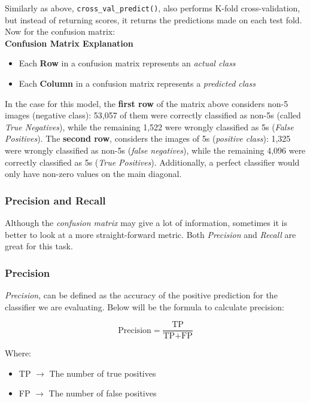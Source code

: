 \noindent
Similarly as above, \texttt{cross_val_predict()}, also performs K-fold cross-validation,
but instead of returning scores, it returns the predictions made on each test fold. Now for the
confusion matrix:\\

\noindent 
\textbf{Confusion Matrix Explanation}
\begin{itemize}
    \item Each \textbf{Row} in a confusion matrix represents an \textit{actual class}
    \item Each \textbf{Column} in a confusion matrix represents a \textit{predicted class}
\end{itemize}

\noindent
In the case for this model, the \textbf{first row} of the matrix above considers non-5 images (negative class):
53,057 of them were correctly classified as non-5s (called \textit{True Negatives}), while the 
remaining 1,522 were wrongly classified as 5s (\textit{False Positives}). The \textbf{second row}, 
considers the images of 5s (\textit{positive class}): 1,325 were wrongly classified as non-5s 
(\textit{false negatives}), while the remaining 4,096 were correctly classified as 5s (\textit{True Positives}).
Additionally, a perfect classifier would only have non-zero values on the main diagonal. 

\subsubsection{Precision and Recall}

Although the \textit{confusion matrix} may give a lot of information, sometimes it is better to look at a more 
straight-forward metric. Both \textit{Precision} and \textit{Recall} are great for this task.

\subsubsection*{Precision}

\textit{Precision}, can be defined as the accuracy of the positive prediction for the classifier we are evaluating.
Below will be the formula to calculate precision:

$$\text{Precision} = \frac{\text{TP}}{\text{TP} + \text{FP}}$$

\noindent 
Where:
\begin{itemize}
    \item TP $\rightarrow$ The number of true positives
    \item FP $\rightarrow$ The number of false positives
\end{itemize}


